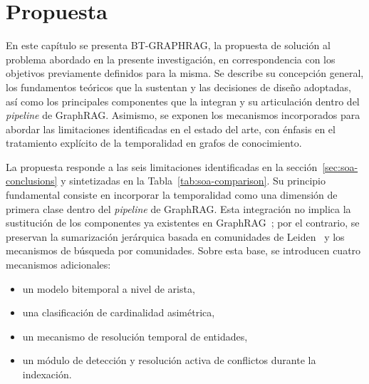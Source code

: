 \chapter{Propuesta}\label{chapter:proposal}

En este capítulo se presenta BT-GRAPHRAG, la propuesta de solución al problema abordado en la presente investigación, en correspondencia con los objetivos previamente definidos para la misma. Se describe su concepción general, los fundamentos teóricos que la sustentan y las decisiones de diseño adoptadas, así como los principales componentes que la integran y su articulación dentro del \emph{pipeline} de GraphRAG. Asimismo, se exponen los mecanismos incorporados para abordar las limitaciones identificadas en el estado del arte, con énfasis en el tratamiento explícito de la temporalidad en grafos de conocimiento.

La propuesta responde a las seis limitaciones identificadas en la sección~\ref{sec:soa-conclusions} y sintetizadas en la Tabla~\ref{tab:soa-comparison}. Su principio fundamental consiste en incorporar la temporalidad como una dimensión de primera clase dentro del \emph{pipeline} de GraphRAG. Esta integración no implica la sustitución de los componentes ya existentes en GraphRAG~\cite{edge2024local}; por el contrario, se preservan la sumarización jerárquica basada en comunidades de Leiden~\cite{traag2019leiden} y los mecanismos de búsqueda por comunidades. Sobre esta base, se introducen cuatro mecanismos adicionales:
\begin{itemize}
    \item un modelo bitemporal a nivel de arista,
    \item una clasificación de cardinalidad asimétrica,
    \item un mecanismo de resolución temporal de entidades,
    \item un módulo de detección y resolución activa de conflictos durante la indexación.
\end{itemize}

